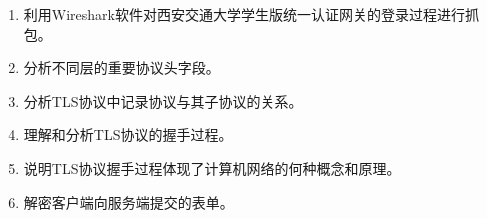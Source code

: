 \begin{enumerate}
	\item 利用Wireshark软件对西安交通大学学生版统一认证网关的登录过程进行抓包。
	\item 分析不同层的重要协议头字段。
	\item 分析TLS协议中记录协议与其子协议的关系。
	\item 理解和分析TLS协议的握手过程。
	\item 说明TLS协议握手过程体现了计算机网络的何种概念和原理。
	\item 解密客户端向服务端提交的表单。
\end{enumerate}